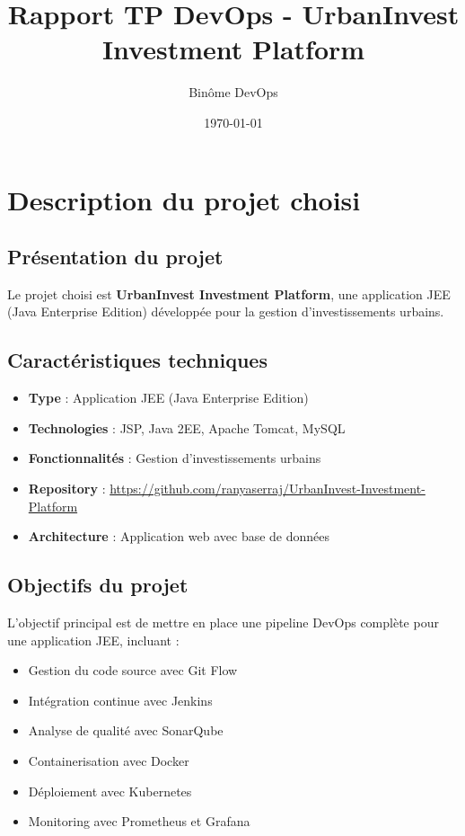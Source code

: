 \documentclass[12pt,a4paper]{article}
\title{\textbf{Rapport TP DevOps - UrbanInvest Investment Platform}}
\author{Binôme DevOps}
\date{\today}
\begin{document}
\maketitle
\tableofcontents
\newpage

\section{Description du projet choisi}

\subsection{Présentation du projet}
Le projet choisi est \textbf{UrbanInvest Investment Platform}, une application JEE (Java Enterprise Edition) développée pour la gestion d'investissements urbains.

\subsection{Caractéristiques techniques}
\begin{itemize}
    \item \textbf{Type} : Application JEE (Java Enterprise Edition)
    \item \textbf{Technologies} : JSP, Java 2EE, Apache Tomcat, MySQL
    \item \textbf{Fonctionnalités} : Gestion d'investissements urbains
    \item \textbf{Repository} : \url{https://github.com/ranyaserraj/UrbanInvest-Investment-Platform}
    \item \textbf{Architecture} : Application web avec base de données
\end{itemize}

\subsection{Objectifs du projet}
L'objectif principal est de mettre en place une pipeline DevOps complète pour une application JEE, incluant :
\begin{itemize}
    \item Gestion du code source avec Git Flow
    \item Intégration continue avec Jenkins
    \item Analyse de qualité avec SonarQube
    \item Containerisation avec Docker
    \item Déploiement avec Kubernetes
    \item Monitoring avec Prometheus et Grafana
\end{itemize}
\end{document}
